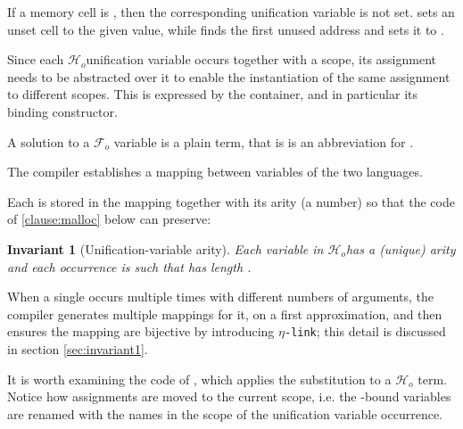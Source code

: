 \documentclass[sigconf,natbib=false,review]{acmart}
\newtheorem{invariant}{Invariant}
\newcommand{\linkMacro}[1]{\ensuremath{#1}\texttt{-link}\xspace}
\newcommand{\linketa} {\linkMacro{\eta}}
\newcommand{\Fo}{\texorpdfstring{\ensuremath{\mathcal{F}_{\!o}\xspace}}{Fo}} %
\newcommand{\Ho}{\texorpdfstring{\ensuremath{\mathcal{H}_o}\xspace}{Ho}}
\begin{document}


\noindent
If a memory cell is , then the corresponding unification variable
is not set.  sets an unset cell to the given value, while
 finds the first unused address and sets it to .

Since each \Ho unification variable occurs together with a scope,
its assignment needs to be abstracted over it to enable the
instantiation of the same assignment to different scopes.
This is expressed by the  container, and in particular
its  binding constructor.



\noindent
A solution to a \Fo{} variable is a plain term, that is 
is an abbreviation for .

The compiler establishes a mapping between variables of the two languages.



\noindent
Each  is stored in the mapping together with
its arity (a number) so that the code of \ref{clause:malloc} below can preserve:

\begin{invariant}[Unification-variable arity]\label{inv:uvaarity}
  Each variable 
  in \Ho has a (unique) arity  and each occurrence
   is such that  has length .
\end{invariant}



\noindent
When a single  occurs multiple times with different numbers
of arguments, the compiler generates multiple mappings for it, on a first
approximation, and then ensures the mapping are bijective by introducing
\linketa; this detail is discussed in section \ref{sec:invariant1}.

% 
It is worth examining the code of , which
applies the substitution to a \Ho{} term. Notice how assignments are moved
to the current scope, i.e. the -bound variables are renamed
with the names in the scope of the unification variable occurrence.
\end{document}
